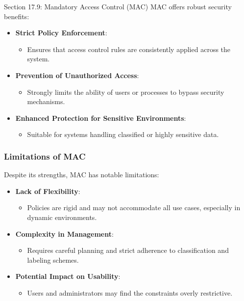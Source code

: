 \begin{notes}{Section 17.9: Mandatory Access Control (MAC)}
    MAC offers robust security benefits:
    \begin{itemize}
        \item \textbf{Strict Policy Enforcement}:
        \begin{itemize}
            \item Ensures that access control rules are consistently applied across the system.
        \end{itemize}
        \item \textbf{Prevention of Unauthorized Access}:
        \begin{itemize}
            \item Strongly limits the ability of users or processes to bypass security mechanisms.
        \end{itemize}
        \item \textbf{Enhanced Protection for Sensitive Environments}:
        \begin{itemize}
            \item Suitable for systems handling classified or highly sensitive data.
        \end{itemize}
    \end{itemize}
    
    \subsubsection*{Limitations of MAC}
    
    Despite its strengths, MAC has notable limitations:
    \begin{itemize}
        \item \textbf{Lack of Flexibility}:
        \begin{itemize}
            \item Policies are rigid and may not accommodate all use cases, especially in dynamic environments.
        \end{itemize}
        \item \textbf{Complexity in Management}:
        \begin{itemize}
            \item Requires careful planning and strict adherence to classification and labeling schemes.
        \end{itemize}
        \item \textbf{Potential Impact on Usability}:
        \begin{itemize}
            \item Users and administrators may find the constraints overly restrictive.
        \end{itemize}
    \end{itemize}
    

\end{notes}
